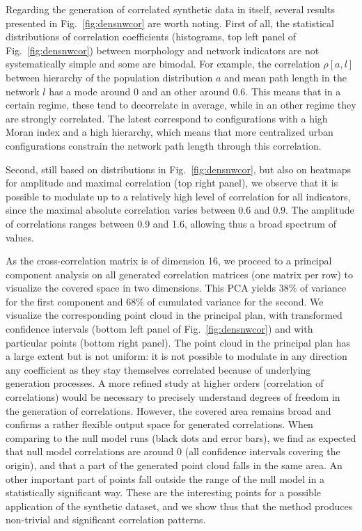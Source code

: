 \documentclass{article}
\begin{document}
Regarding the generation of correlated synthetic data in itself, several results presented in Fig.~\ref{fig:densnwcor} are worth noting. First of all, the statistical distributions of correlation coefficients (histograms, top left panel of Fig.~\ref{fig:densnwcor}) between morphology and network indicators are not systematically simple and some are bimodal. For example, the correlation $\rho[a,l]$ between hierarchy of the population distribution $a$ and mean path length in the network $l$ has a mode around 0 and an other around 0.6. This means that in a certain regime, these tend to decorrelate in average, while in an other regime they are strongly correlated. The latest correspond to configurations with a high Moran index and a high hierarchy, which means that more centralized urban configurations constrain the network path length through this correlation.

Second, still based on distributions in Fig.~\ref{fig:densnwcor}, but also on heatmaps for amplitude and maximal correlation (top right panel), we observe that it is possible to modulate up to a relatively high level of correlation for all indicators, since the maximal absolute correlation varies between 0.6 and 0.9. The amplitude of correlations ranges between 0.9 and 1.6, allowing thus a broad spectrum of values.

As the cross-correlation matrix is of dimension 16, we proceed to a principal component analysis on all generated correlation matrices (one matrix per row) to visualize the covered space in two dimensions. This PCA yields 38\% of variance for the first component and 68\% of cumulated variance for the second. We visualize the corresponding point cloud in the principal plan, with transformed confidence intervals (bottom left panel of Fig.~\ref{fig:densnwcor}) and with particular points (bottom right panel). The point cloud in the principal plan has a large extent but is not uniform: it is not possible to modulate in any direction any coefficient as they stay themselves correlated because of underlying generation processes. A more refined study at higher orders (correlation of correlations) would be necessary to precisely understand degrees of freedom in the generation of correlations. However, the covered area remains broad and confirms a rather flexible output space for generated correlations. When comparing to the null model runs (black dots and error bars), we find as expected that null model correlations are around 0 (all confidence intervals covering the origin), and that a part of the generated point cloud falls in the same area. An other important part of points fall outside the range of the null model in a statistically significant way. These are the interesting points for a possible application of the synthetic dataset, and we show thus that the method produces non-trivial and significant correlation patterns.
\end{document}
